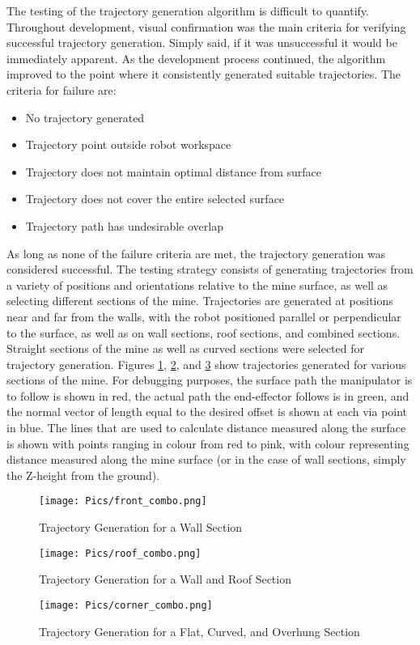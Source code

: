 The testing of the trajectory generation algorithm is difficult to quantify. Throughout development, visual confirmation was the main criteria for verifying successful trajectory generation. Simply said, if it was unsuccessful it would be immediately apparent. As the development process continued, the algorithm improved to the point where it consistently generated suitable trajectories. The criteria for failure are:

\begin{itemize}
    \item No trajectory generated
    \item Trajectory point outside robot workspace
    \item Trajectory does not maintain optimal distance from surface
    \item Trajectory does not cover the entire selected surface
    \item Trajectory path has undesirable overlap
\end{itemize}

As long as none of the failure criteria are met, the trajectory generation was considered successful. The testing strategy consists of generating trajectories from a variety of positions and orientations relative to the mine surface, as well as selecting different sections of the mine. Trajectories are generated at positions near and far from the walls, with the robot positioned parallel or perpendicular to the surface, as well as on wall sections, roof sections, and combined sections. Straight sections of the mine as well as curved sections were selected for trajectory generation. Figures \ref{fig:traj1}, \ref{fig:traj2}, and \ref{fig:traj3} show trajectories generated for various sections of the mine. For debugging purposes, the surface path the manipulator is to follow is shown in red, the actual path the end-effector follows is in green, and the normal vector of length equal to the desired offset is shown at each via point in blue. The lines that are used to calculate distance measured along the surface is shown with points ranging in colour from red to pink, with colour representing distance measured along the mine surface (or in the case of wall sections, simply the Z-height from the ground).\\

\begin{figure}
    \centering
    \texttt{[image: Pics/front\_combo.png]}
    \caption{Trajectory Generation for a Wall Section}
    \label{fig:traj1}
\end{figure}
\begin{figure}
    \centering
    \texttt{[image: Pics/roof\_combo.png]}
    \caption{Trajectory Generation for a Wall and Roof Section}
    \label{fig:traj2}
\end{figure}
\begin{figure}
    \centering
    \texttt{[image: Pics/corner\_combo.png]}
    \caption{Trajectory Generation for a Flat, Curved, and Overhung Section}
    \label{fig:traj3}
\end{figure}


